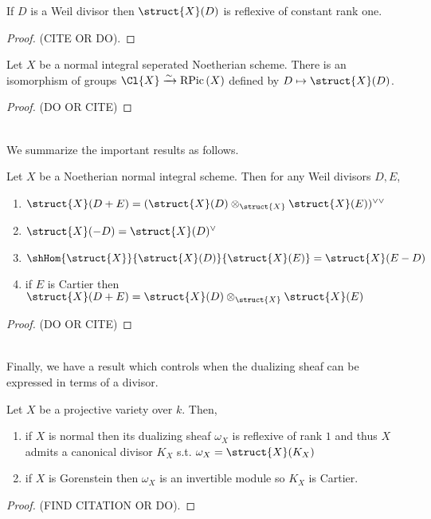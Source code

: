 \documentclass[12pt]{article}
\begin{document}
\begin{prop}
If $D$ is a Weil divisor then $\struct{X}(D)$ is reflexive of constant rank one. 
\end{prop}

\begin{proof}
(CITE OR DO).
\end{proof}

\begin{theorem}
Let $X$ be a normal integral seperated Noetherian scheme. There is an isomorphism of groups $\Cl{X} \xrightarrow{\sim} \RPic{X}$ defined by $D \mapsto \struct{X}(D)$.
\end{theorem}

\begin{proof}
(DO OR CITE)
\end{proof}
\noindent\\
We summarize the important results as follows.
\begin{theorem}
Let $X$ be a Noetherian normal integral scheme. Then for any Weil divisors $D, E$,
\begin{enumerate}
\item $\struct{X}(D + E) = (\struct{X}(D) \otimes_{\struct{X}} \struct{X}(E))^{\vee \vee}$
\item $\struct{X}(-D) = \struct{X}(D)^\vee$
\item $\shHom{\struct{X}}{\struct{X}(D)}{\struct{X}(E)} = \struct{X}(E - D)$
\item if $E$ is Cartier then $\struct{X}(D + E) = \struct{X}(D) \otimes_{\struct{X}} \struct{X}(E)$
\end{enumerate}
\begin{center}

\begin{proof}
(DO OR CITE)
\end{proof}

\end{center}
\end{theorem}
\noindent\\
Finally, we have a result which controls when the dualizing sheaf can be expressed in terms of a divisor.
\begin{prop}
Let $X$ be a projective variety over $k$. Then,
\begin{enumerate}
\item if $X$ is normal then its dualizing sheaf $\omega_X$ is reflexive of rank $1$ and thus $X$ admits a canonical divisor $K_X$ s.t. $\omega_X = \struct{X}(K_X)$
\item if $X$ is Gorenstein then $\omega_X$ is an invertible module so $K_X$ is Cartier.
\end{enumerate}
\end{prop}

\begin{proof}
(FIND CITATION OR DO).
\end{proof}
\end{document}
